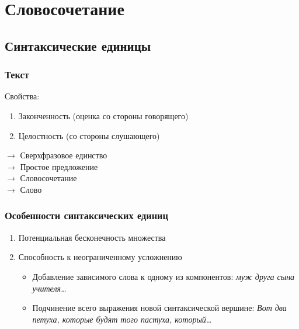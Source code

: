 \section{Словосочетание}

\subsection{Синтаксические единицы}

\begin{frame}
  \frametitle{Текст}

  Свойства: \begin{enumerate}
    \item Законченность (оценка со стороны говорящего)
    \item Целостность (со стороны слушающего)
  \end{enumerate}

  \vfill

  $\rightarrow$ Сверхфразовое единство \\
  $\rightarrow$ Простое предложение \\
  $\rightarrow$ Словосочетание \\
  $\rightarrow$ Слово
\end{frame}

\begin{frame}
  \frametitle{Особенности синтаксических единиц}

  \begin{enumerate}
    \item Потенциальная бесконечность множества
    \item Способность к неограниченному усложнению \begin{itemize}
      \item Добавление зависимого слова к одному из компонентов: \textit{муж друга сына учителя\ldots}
      \item Подчинение всего выражения новой синтаксической вершине: \textit{Вот два петуха, которые будят того пастуха, который\ldots}
    \end{itemize}
  \end{enumerate}
\end{frame}

